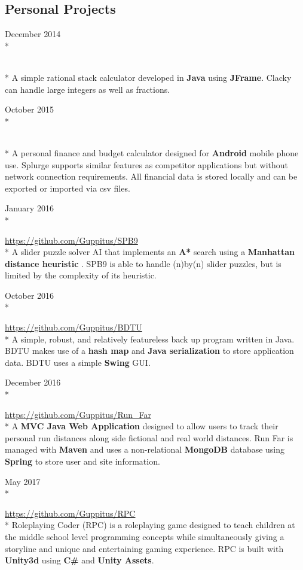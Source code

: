 \documentclass[a4paper,margin,line]{resume}
\newcommand{\rurl}[1]{\hfill {\footnotesize \url{#1}}}
\newcommand{\rdate}[1]{\hfill {\small #1}}
\newcommand{\rproject}[4]{\item[#1] \hfill \rdate{#2} \\* \hfill \rdate{#3} \strut\hfill \rurl{#4} \\*}
\begin{document}
\begin{resume}
\section{\mysidestyle Personal Projects}
    \begin{asparadesc}
    
		\rproject{Clacky}{December 2014}{}{}
		\small
		A simple rational stack calculator developed in {\bf Java} using {\bf JFrame}. Clacky can handle large integers as well as fractions.
		\normalsize
		\\

		\rproject{Splurge}{October 2015}{}{}
		\small
		A personal finance and budget calculator designed for {\bf Android} mobile phone use. Splurge supports similar features as competitor applications but without network connection requirements. All financial data is stored locally and can be exported or imported via csv files.
		\normalsize
		\\    
    	
        \rproject{SPB9}{January 2016}{}{https://github.com/Guppitus/SPB9}
        \small
        A slider puzzle solver AI that implements an {\bf A*} search using a {\bf Manhattan distance heuristic }. SPB9 is able to handle (n)by(n) slider puzzles, but is limited by the complexity of its heuristic.
        \normalsize
        \\
        
        \rproject{BDTU}{October 2016}{}{https://github.com/Guppitus/BDTU}
        \small
        A simple, robust, and relatively featureless back up program written in Java. BDTU makes use of a {\bf hash map} and {\bf Java serialization } to store application data. BDTU uses a simple {\bf Swing} GUI. 
        \normalsize
        \\
        
        \rproject{Run Far}{December 2016}{}{https://github.com/Guppitus/Run_Far}
        \small
        A {\bf MVC Java Web Application} designed to allow users to track their personal run distances along side fictional and real world distances. Run Far is managed with {\bf Maven} and uses a non-relational {\bf MongoDB} database using {\bf Spring} to store user and site information. 
        \normalsize
        \\
        
        \rproject{RPC}{May 2017}{}{https://github.com/Guppitus/RPC}
        \small
        Roleplaying Coder (RPC) is a roleplaying game designed to teach children at the middle school level programming concepts while simultaneously giving a storyline and unique and entertaining gaming experience. RPC is built with {\bf Unity3d} using {\bf C\#} and {\bf Unity Assets}.  
        

\end{asparadesc}
\end{resume}
\end{document}
